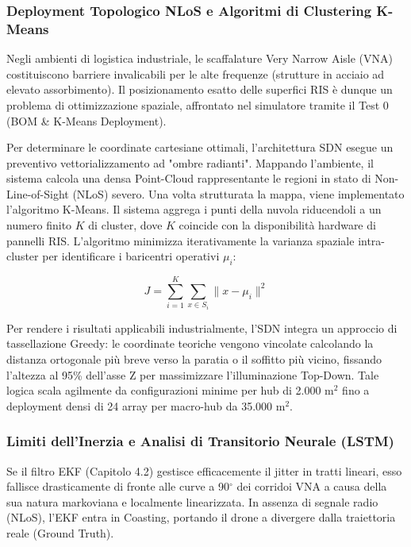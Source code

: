 \documentclass[twoside]{article}
\begin{document}
\subsubsection{Deployment Topologico NLoS e Algoritmi di Clustering K-Means}

Negli ambienti di logistica industriale, le scaffalature Very Narrow Aisle (VNA) costituiscono barriere invalicabili per le alte frequenze (strutture in acciaio ad elevato assorbimento). Il posizionamento esatto delle superfici RIS è dunque un problema di ottimizzazione spaziale, affrontato nel simulatore tramite il Test 0 (BOM \& K-Means Deployment).

Per determinare le coordinate cartesiane ottimali, l'architettura SDN esegue un preventivo vettorializzamento ad "ombre radianti". Mappando l'ambiente, il sistema calcola una densa Point-Cloud rappresentante le regioni in stato di Non-Line-of-Sight (NLoS) severo. Una volta strutturata la mappa, viene implementato l'algoritmo K-Means. Il sistema aggrega i punti della nuvola riducendoli a un numero finito $K$ di cluster, dove $K$ coincide con la disponibilità hardware di pannelli RIS. L'algoritmo minimizza iterativamente la varianza spaziale intra-cluster per identificare i baricentri operativi $\mu_i$:

\begin{equation}
J = \sum_{i=1}^{K} \sum_{x \in S_i} \|x - \mu_i\|^2
\label{eq:kmeans_objective}
\end{equation}

Per rendere i risultati applicabili industrialmente, l'SDN integra un approccio di tassellazione Greedy: le coordinate teoriche vengono vincolate calcolando la distanza ortogonale più breve verso la paratia o il soffitto più vicino, fissando l'altezza al 95\% dell'asse Z per massimizzare l'illuminazione Top-Down. Tale logica scala agilmente da configurazioni minime per hub di 2.000 m$^2$ fino a deployment densi di 24 array per macro-hub da 35.000 m$^2$.

\subsubsection{Limiti dell'Inerzia e Analisi di Transitorio Neurale (LSTM)}

Se il filtro EKF (Capitolo 4.2) gestisce efficacemente il jitter in tratti lineari, esso fallisce drasticamente di fronte alle curve a 90$^\circ$ dei corridoi VNA a causa della sua natura markoviana e localmente linearizzata. In assenza di segnale radio (NLoS), l'EKF entra in Coasting, portando il drone a divergere dalla traiettoria reale (Ground Truth).
\end{document}
